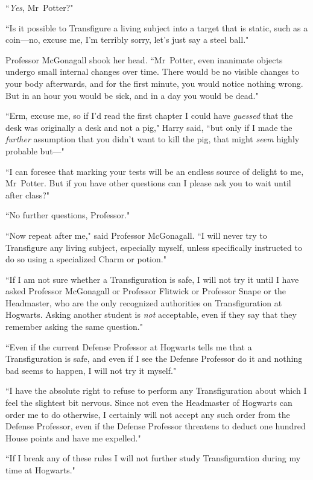``\emph{Yes}, Mr~Potter?"

``Is it possible to Transfigure a living subject into a target that is static, such as a coin—no, excuse me, I'm terribly sorry, let's just say a steel ball."

Professor McGonagall shook her head. ``Mr~Potter, even inanimate objects undergo small internal changes over time. There would be no visible changes to your body afterwards, and for the first minute, you would notice nothing wrong. But in an hour you would be sick, and in a day you would be dead."

``Erm, excuse me, so if I'd read the first chapter I could have \emph{guessed} that the desk was originally a desk and not a pig," Harry said, ``but only if I made the \emph{further} assumption that you didn't want to kill the pig, that might \emph{seem} highly probable but—"

``I can foresee that marking your tests will be an endless source of delight to me, Mr~Potter. But if you have other questions can I please ask you to wait until after class?"

``No further questions, Professor."

``Now repeat after me," said Professor McGonagall. ``I will never try to Transfigure any living subject, especially myself, unless specifically instructed to do so using a specialized Charm or potion."

``If I am not sure whether a Transfiguration is safe, I will not try it until I have asked Professor McGonagall or Professor Flitwick or Professor Snape or the Headmaster, who are the only recognized authorities on Transfiguration at Hogwarts. Asking another student is \emph{not} acceptable, even if they say that they remember asking the same question."

``Even if the current Defense Professor at Hogwarts tells me that a Transfiguration is safe, and even if I see the Defense Professor do it and nothing bad seems to happen, I will not try it myself."

``I have the absolute right to refuse to perform any Transfiguration about which I feel the slightest bit nervous. Since not even the Headmaster of Hogwarts can order me to do otherwise, I certainly will not accept any such order from the Defense Professor, even if the Defense Professor threatens to deduct one hundred House points and have me expelled."

``If I break any of these rules I will not further study Transfiguration during my time at Hogwarts."


